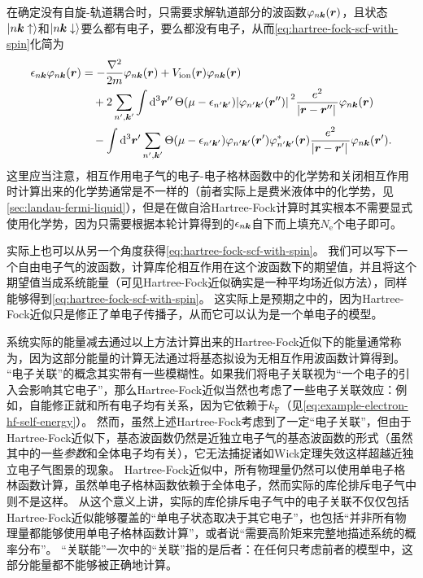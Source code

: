 在确定没有自旋-轨道耦合时，只需要求解轨道部分的波函数$\varphi_{n \vb*{k}}(\vb*{r})$，且状态$\ket{n \vb*{k} \uparrow}$和$\ket{n \vb*{k} \downarrow}$要么都有电子，要么都没有电子，从而\eqref{eq:hartree-fock-scf-with-spin}化简为
\begin{equation}
    \begin{aligned}
        \epsilon_{n \vb*{k}} \varphi_{n \vb*{k}}(\vb*{r}) &= - \frac{\laplacian}{2m} \varphi_{n \vb*{k}}(\vb*{r}) + V_\text{ion}(\vb*{r}) \varphi_{n \vb*{k}}(\vb*{r}) \\
        &\quad + 2 \sum_{n', \vb*{k}'} \int \dd[3]{\vb*{r}''} \Theta(\mu - \epsilon_{n' \vb*{k}'}) \abs*{\varphi_{n' \vb*{k}'}(\vb*{r}'' )}^2 \frac{e^2}{\abs*{\vb*{r} - \vb*{r}''}} \varphi_{n \vb*{k}}(\vb*{r} ) \\
        &\quad - \int \dd[3]{\vb*{r}'} \sum_{n', \vb*{k}'} \Theta(\mu - \epsilon_{n' \vb*{k}'}) \varphi_{n' \vb*{k}'}(\vb*{r}' ) \varphi^*_{n' \vb*{k}'}(\vb*{r} ) \frac{e^2}{\abs*{\vb*{r} - \vb*{r}'}} \varphi_{n \vb*{k}}(\vb*{r}' ) .
    \end{aligned}
    \label{eq:hartree-fock-scf-spinless}
\end{equation}
这里应当注意，相互作用电子气的电子-电子格林函数中的化学势和关闭相互作用时计算出来的化学势通常是不一样的（前者实际上是费米液体中的化学势，见\autoref{sec:landau-fermi-liquid}），但是在做自洽Hartree-Fock计算时其实根本不需要显式使用化学势，因为只需要根据本轮计算得到的$\epsilon_{n \vb*{k}}$自下而上填充$N_\text{e}$个电子即可。

实际上也可以从另一个角度获得\eqref{eq:hartree-fock-scf-with-spin}。
我们可以写下一个自由电子气的波函数，计算库伦相互作用在这个波函数下的期望值，并且将这个期望值当成系统能量（可见Hartree-Fock近似确实是一种平均场近似方法），同样能够得到\eqref{eq:hartree-fock-scf-with-spin}。
这实际上是预期之中的，因为Hartree-Fock近似只是修正了单电子传播子，从而它可以认为是一个单电子的模型。

系统实际的能量减去通过以上方法计算出来的Hartree-Fock近似下的能量通常称为，因为这部分能量的计算无法通过将基态拟设为无相互作用波函数计算得到。
“电子关联”的概念其实带有一些模糊性。如果我们将电子关联视为“一个电子的引入会影响其它电子”，那么Hartree-Fock近似当然也考虑了一些电子关联效应：例如，自能修正就和所有电子均有关系，因为它依赖于$k_\text{F}$（见\eqref{eq:example-electron-hf-self-energy}）。
然而，虽然上述Hartree-Fock考虑到了一定“电子关联”，但由于Hartree-Fock近似下，基态波函数仍然是近独立电子气的基态波函数的形式（虽然其中的一些\emph{参数}和全体电子均有关），它无法捕捉诸如Wick定理失效这样超越近独立电子气图景的现象。
Hartree-Fock近似中，所有物理量仍然可以使用单电子格林函数计算，虽然单电子格林函数依赖于全体电子，然而实际的库伦排斥电子气中则不是这样。
从这个意义上讲，实际的库伦排斥电子气中的电子关联不仅仅包括Hartree-Fock近似能够覆盖的“单电子状态取决于其它电子”，也包括“并非所有物理量都能够使用单电子格林函数计算”，或者说“需要高阶矩来完整地描述系统的概率分布”。
“关联能”一次中的“关联”指的是后者：在任何只考虑前者的模型中，这部分能量都不能够被正确地计算。

